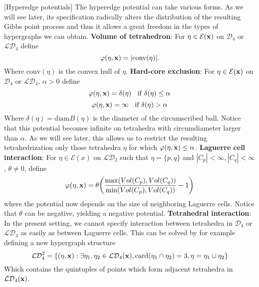 \begin{ex}\label{ex:potentials}[Hyperedge potentials]
	The hyperedge potential can take various forms. As we will see later, its specification radically alters the distribution of the resulting Gibbs point process and thus it allows a great freedom in the types of hypergraphs we can obtain.\newline
	\textbf{Volume of tetrahedron}: For $\eta\in\mathcal E({\mathbf{x}})$ on $\mathcal D_4$ or $\mathcal {LD}_4$ define
	$$\varphi(\eta,{\mathbf{x}}) = |\mathrm{conv}(\eta)| .$$
	Where $\mathrm{conv}(\eta)$ is the convex hull of $\eta$.	\newline
	\textbf{Hard-core exclusion}: For $\eta\in\mathcal E({\mathbf{x}})$ on $\mathcal D_4$ or $\mathcal {LD}_4$, $\alpha >0$ define
	$$\varphi(\eta,{\mathbf{x}}) = \delta(\eta)\;\; \text{ if } \delta(\eta) \leq \alpha$$
	$$\varphi(\eta,{\mathbf{x}}) = \infty \;\; \text { if } \delta(\eta) > \alpha$$
	Where $\delta(\eta)= \mathrm{diam}B(\eta)$ is the diameter of the circumscribed ball. Notice that this potential becomes infinite on tetrahedra with circumdiameter larger than $\alpha$. As we will see later, this allows us to restrict the resulting tetrahedrization only those tetrahedra $\eta$ for which $\varphi(\eta,{\mathbf{x}}) \leq \alpha$.\newline
	\textbf{Laguerre cell interaction}: For $\eta \in \mathcal E(x)$ on $\mathcal {LD}_2$ such that $\eta=\{p,q\}$ and $|C_p| < \infty, |C_q| < \infty$, $\theta \neq 0$, define
$$\varphi(\eta,{\mathbf{x}}) = \theta \bigg (\frac {\max ( Vol(C_p), Vol(C_q))}{\min(Vol(C_p),Vol(C_q))} - 1\bigg)$$
where the potential now depends on the size of neighboring Laguerre cells. Notice that $\theta$ can be negative, yielding a negative potential. \newline
\textbf{Tetrahedral interaction}: In the present setting, we cannot specify interaction between tetrahedra in $\mathcal D_4$ or $\mathcal {LD}_4$ as easily as between Laguerre cells. This can be solved by for example defining a new hypergraph structure
$$\mathcal {LD}^2_4 = \{(\eta,{\mathbf{x}}): \exists \eta_1,\eta_2\in\mathcal {LD}_4({\mathbf{x}}), \mathrm{card}(\eta_1 \cap \eta_2)=3, \eta = \eta_1 \cup \eta_2\}$$
Which contains the quintuples of points which form adjacent tetrahedra in $\mathcal {LD}_4({\mathbf{x}})$. 
\end{ex}

